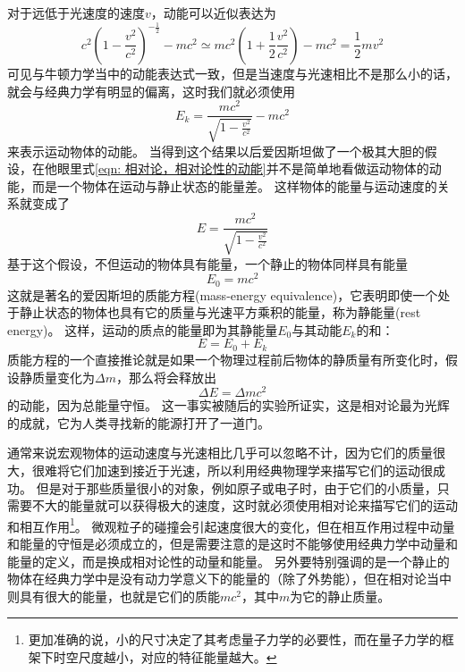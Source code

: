 对于远低于光速度的速度$v$，动能可以近似表达为
\begin{equation}
c^2\left(1-\frac{v^2}{c^2}\right)^{-\frac{1}{2}}-mc^2\simeq mc^2\left(1+\frac{1}{2}\frac{v^2}{c^2}\right)-mc^2=\frac{1}{2}mv^2
\end{equation}
可见与牛顿力学当中的动能表达式一致，但是当速度与光速相比不是那么小的话，就会与经典力学有明显的偏离，这时我们就必须使用
\begin{equation}\label{eqn: 相对论，相对论性的动能}
E_k=\frac{mc^2}{\sqrt{1-\frac{v^2}{c^2}}}-mc^2
\end{equation}
来表示运动物体的动能。
当得到这个结果以后爱因斯坦做了一个极其大胆的假设，在他眼里式\ref{eqn: 相对论，相对论性的动能}并不是简单地看做运动物体的动能，而是一个物体在运动与静止状态的能量差。
这样物体的能量与运动速度的关系就变成了
\begin{equation}\label{eqn: relativity-e=mcsqre/sqrt}
E=\frac{mc^2}{\sqrt{1-\frac{v^2}{c^2}}}
\end{equation}
基于这个假设，不但运动的物体具有能量，一个静止的物体同样具有能量
\begin{equation}
E_0=mc^2
\end{equation}
这就是著名的爱因斯坦的{\heiti 质能方程}(mass-energy equivalence)，它表明即使一个处于静止状态的物体也具有它的质量与光速平方乘积的能量，称为{\heiti 静能量}(rest energy)。
这样，运动的质点的能量即为其静能量$E_0$与其动能$E_k$的和：
\[E=E_0+E_k\]
质能方程的一个直接推论就是如果一个物理过程前后物体的静质量有所变化时，假设静质量变化为$\Delta m$，那么将会释放出
\begin{equation}
\Delta E = \Delta m c^2
\end{equation}
的动能，因为总能量守恒。
这一事实被随后的实验所证实，这是相对论最为光辉的成就，它为人类寻找新的能源打开了一道门。

通常来说宏观物体的运动速度与光速相比几乎可以忽略不计，因为它们的质量很大，很难将它们加速到接近于光速，所以利用经典物理学来描写它们的运动很成功。
但是对于那些质量很小的对象，例如原子或电子时，由于它们的小质量，只需要不大的能量就可以获得极大的速度，这时就必须使用相对论来描写它们的运动和相互作用\footnote{更加准确的说，小的尺寸决定了其考虑量子力学的必要性，而在量子力学的框架下时空尺度越小，对应的特征能量越大。}。
微观粒子的碰撞会引起速度很大的变化，但在相互作用过程中动量和能量的守恒是必须成立的，但是需要注意的是这时不能够使用经典力学中动量和能量的定义，而是换成相对论性的动量和能量。
另外要特别强调的是一个静止的物体在经典力学中是没有动力学意义下的能量的（除了外势能），但在相对论当中则具有很大的能量，也就是它们的质能$mc^2$，其中$m$为它的静止质量。

